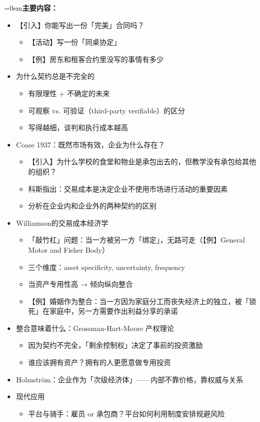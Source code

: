 \documentclass[10pt,a4paper]{ctexart}
\newcommand{\field}[1]{\par\noindent\hangindent=0em\textbf{#1}\hspace{0.2em}}
\begin{document}
\field{主要内容：}
\begin{itemize}
  \item 【引入】你能写出一份「完美」合同吗？
  \begin{itemize}
    \item 【活动】写一份「同桌协定」
    \item 【例】房东和租客合约里没写的事情有多少
  \end{itemize}
  \item 为什么契约总是不完全的
  \begin{itemize}
    \item 有限理性 + 不确定的未来
    \item 可观察 vs. 可验证（third-party verifiable）的区分
    \item 写得越细，谈判和执行成本越高
  \end{itemize}
  \item Coase 1937：既然市场有效，企业为什么存在？
  \begin{itemize}
    \item 【引入】为什么学校的食堂和物业是承包出去的，但教学没有承包给其他的组织？
    \item 科斯指出：交易成本是决定企业不使用市场进行活动的重要因素
    \item 分析在企业内和企业外的两种契约的区别
  \end{itemize}
  \item Williamson的交易成本经济学
  \begin{itemize}
    \item 「敲竹杠」问题：当一方被另一方「绑定」，无路可走（【例】General Motor and Fisher Body）
    \item 三个维度：asset specificity, uncertainty, frequency
    \item 当资产专用性高 → 倾向纵向整合
    \item 【例】婚姻作为整合：当一方因为家庭分工而丧失经济上的独立，被「锁死」在家庭中，另一方需要作出利益分享的承诺
  \end{itemize}
  \item 整合意味着什么：Grossman-Hart-Moore 产权理论
  \begin{itemize}
    \item 因为契约不完全，「剩余控制权」决定了事前的投资激励
    \item 谁应该拥有资产？拥有的人更愿意做专用投资
  \end{itemize}
  \item Holmström：企业作为「次级经济体」——内部不靠价格，靠权威与关系
  \item 现代应用
  \begin{itemize}
    \item 平台与骑手：雇员 or 承包商？平台如何利用制度安排规避风险
  \end{itemize}
\end{itemize}
\end{document}

